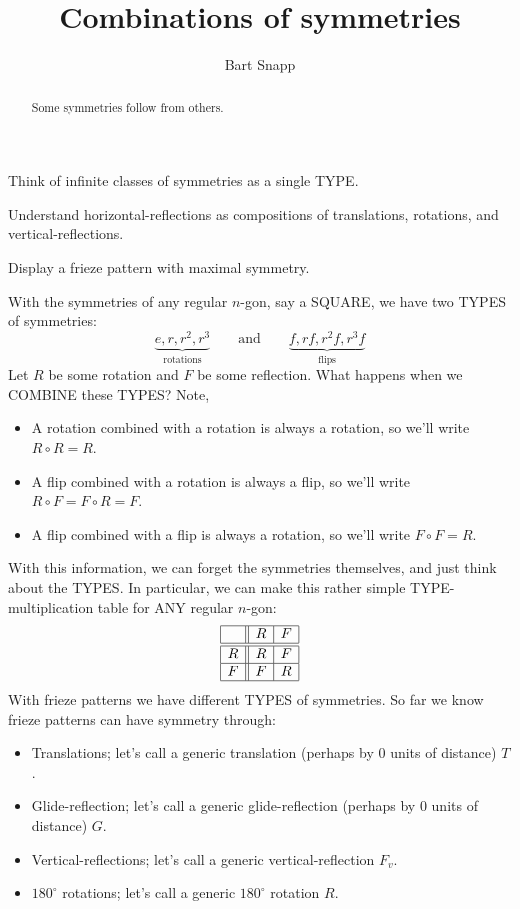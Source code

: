 \documentclass[noauthor,nooutcomes,hints,handout]{ximera}
\author{Bart Snapp}
\title{Combinations of symmetries}
\begin{document}
\begin{abstract}
  Some symmetries follow from others. 
\end{abstract}
\maketitle

\begin{listOutcomes}
\item Think of infinite classes of symmetries as a single TYPE.
\item Understand horizontal-reflections as compositions of
  translations, rotations, and vertical-reflections.
\item Display a frieze pattern with maximal symmetry.
\end{listOutcomes}


With the symmetries of any regular $n$-gon, say a SQUARE, we have two TYPES of symmetries:
\[
\underbrace{e,r,r^2,r^3}_{\text{rotations}} \qquad\text{and}\qquad \underbrace{f, rf,r^2f,r^3f}_{\text{flips}}
\]
Let $R$ be some rotation and $F$ be some reflection. What happens when
we COMBINE these TYPES? Note,
\begin{itemize}
\item A rotation combined with a rotation is always a rotation, so we'll write $R \circ R = R$.
\item A flip combined with a rotation is always a flip, so we'll write
  $R\circ F = F \circ R = F$.
\item A flip combined with a flip is always a rotation, so we'll
  write $F\circ F = R$.
\end{itemize}
With this information, we can forget the symmetries themselves, and
just think about the TYPES. In particular, we can make this rather
simple TYPE-multiplication table for ANY regular $n$-gon:
\[
\begin{array}{|c||c|c|}
    \hline
       & R    & F    \\ \hline\hline
    R  & R    & F    \\ \hline
    F  & F    & R    \\ \hline
\end{array}
\]
With frieze patterns we have different TYPES of symmetries. So far we
know frieze patterns can have symmetry through:
\begin{itemize}
\item Translations; let's call a generic translation (perhaps by $0$ units of distance) $T$.
\item Glide-reflection; let's call a generic glide-reflection (perhaps by $0$ units of distance) $G$.
\item Vertical-reflections; let's call a generic vertical-reflection $F_v$.
\item $180^\circ$ rotations; let's call a generic $180^\circ$
  rotation $R$.
\end{itemize}
\end{document}
